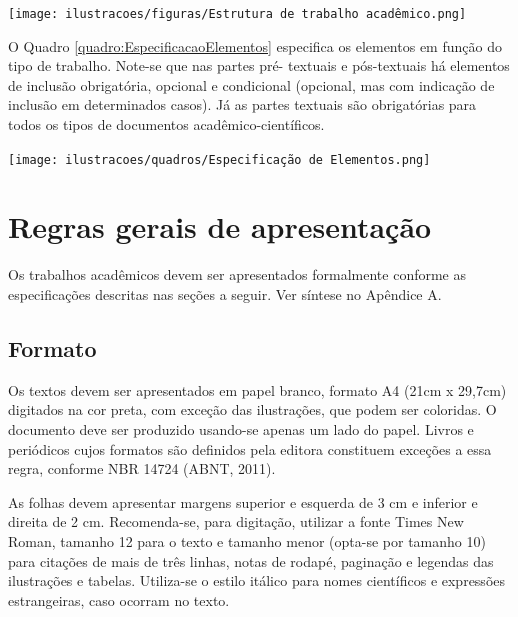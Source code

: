 \documentclass[a4paper,12pt]{article}  %
\begin{document}
\begin{ElementosTextuais}
\begin{Desenvolvimento}
\begin{figura}[h!]
  \centering
  \addfigura
  \texttt{[image: ilustracoes/figuras/Estrutura de trabalho acadêmico.png]}
  \label{figura:EstruturaTrabalhoAcademico}
\end{figura}


O Quadro \ref{quadro:EspecificacaoElementos} especifica os elementos em função do tipo de trabalho. Note-se que nas partes pré- textuais e pós-textuais há elementos de inclusão obrigatória, opcional e condicional (opcional, mas com indicação de inclusão em determinados casos). Já as partes textuais são obrigatórias para todos os tipos de documentos acadêmico-científicos.

\begin{quadro} [h!]
  \centering
  \addquadro
  \texttt{[image: ilustracoes/quadros/Especificação de Elementos.png]}
  \label{quadro:EspecificacaoElementos}
\end{quadro}

\section{Regras gerais de apresentação}
Os trabalhos acadêmicos devem ser apresentados formalmente conforme as especificações descritas nas seções a seguir. Ver síntese no Apêndice A.

\subsection{Formato}
Os textos devem ser apresentados em papel branco, formato A4 (21cm x 29,7cm) digitados na cor preta, com exceção das ilustrações, que podem ser coloridas. O documento deve ser produzido usando-se apenas um lado do papel. Livros e periódicos cujos formatos são definidos pela editora constituem exceções a essa regra, conforme NBR 14724 (ABNT, 2011).

As folhas devem apresentar margens superior e esquerda de 3 cm e inferior e direita de 2 cm. Recomenda-se, para digitação, utilizar a fonte Times New Roman, tamanho 12 para o texto e tamanho menor (opta-se por tamanho 10) para citações de mais de três linhas, notas de rodapé, paginação e legendas das ilustrações e tabelas. Utiliza-se o estilo itálico para nomes científicos e expressões estrangeiras, caso ocorram no texto.


\end{Desenvolvimento}
\end{ElementosTextuais}
\end{document}
